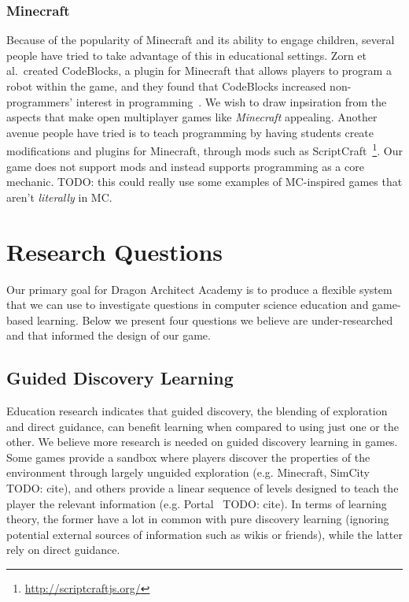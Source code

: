 \documentclass{sig-alternate}
\newcommand{\TODO}[1]{{\color{red} TODO: #1}}
\newcommand{\gametitle}{{\color{RoyalPurple} Dragon Architect Academy}}
\begin{document}
\subsubsection{Minecraft}
Because of the popularity of Minecraft and its ability to engage children, several people have tried to take advantage of this in educational settings.
Zorn et al.\ created CodeBlocks, a plugin for Minecraft that allows players to program a robot within the game, and they found that CodeBlocks increased non-programmers' interest in programming~\cite{zorn2013minecraft}.
We wish to draw inpsiration from the aspects that make open multiplayer games like \emph{Minecraft} appealing.
Another avenue people have tried is to teach programming by having students create modifications and plugins for Minecraft, through mods such as ScriptCraft~\footnote{\url{http://scriptcraftjs.org/}}.
Our game does not support mods and instead supports programming as a core mechanic.
\TODO{this could really use some examples of MC-inspired games that aren't \emph{literally} in MC.}


\section{Research Questions}
\label{sec:research}
Our primary goal for \gametitle{} is to produce a flexible system that we can use to investigate questions in computer science education and game-based learning. 
Below we present four questions we believe are under-researched and that informed the design of our game. 

\subsection{Guided Discovery Learning}
Education research indicates that guided discovery, the blending of exploration and direct guidance, can benefit learning
when compared to using just one or the other. 
We believe more research is needed on guided discovery learning in games. 
Some games provide a sandbox where players discover the properties of the environment through largely unguided exploration (e.g. Minecraft, SimCity~\TODO{cite}), and others provide a linear sequence of levels designed to teach the player the relevant information (e.g. Portal~\TODO{cite}). 
In terms of learning theory, the former have a lot in common with pure discovery learning (ignoring potential external sources of information such as wikis or friends), while the latter rely on direct guidance. 
\end{document}
